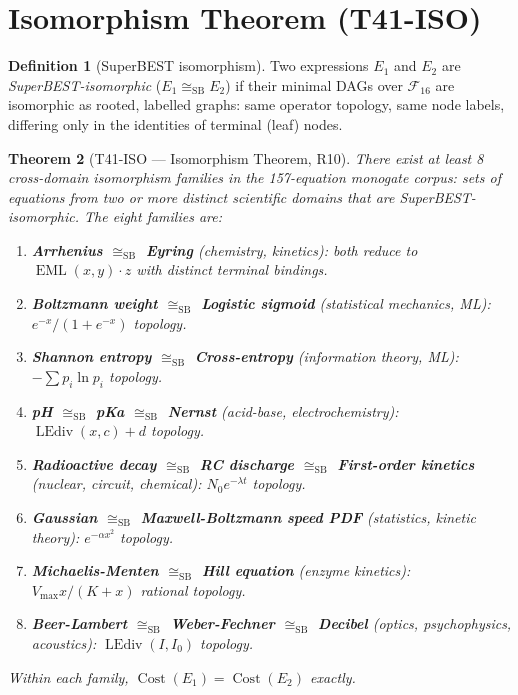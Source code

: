 \documentclass[12pt,a4paper]{article}
\newtheorem{theorem}{Theorem}[section]
\theoremstyle{definition}
\newtheorem{definition}[theorem]{Definition}
\newcommand{\EML}{\operatorname{EML}}
\newcommand{\LEdiv}{\operatorname{LEdiv}}
\newcommand{\Cost}{\operatorname{Cost}}
\newcommand{\siso}{\cong_{\mathrm{SB}}}
\begin{document}
\section{Isomorphism Theorem (T41-ISO)}
\label{sec:iso}

\begin{definition}[SuperBEST isomorphism]
\label{def:iso}
Two expressions $E_1$ and $E_2$ are \emph{SuperBEST-isomorphic}
($E_1 \siso E_2$) if their minimal DAGs over $\mathcal{F}_{16}$ are
isomorphic as rooted, labelled graphs: same operator topology, same node
labels, differing only in the identities of terminal (leaf) nodes.
\end{definition}

\begin{theorem}[T41-ISO --- Isomorphism Theorem, R10]
\label{thm:ISO}
There exist at least 8 cross-domain isomorphism families in the 157-equation
monogate corpus: sets of equations from two or more distinct scientific domains
that are SuperBEST-isomorphic.  The eight families are:
\begin{enumerate}
  \item \textbf{Arrhenius $\siso$ Eyring} (chemistry, kinetics):
        both reduce to $\EML(x, y) \cdot z$ with distinct terminal bindings.
  \item \textbf{Boltzmann weight $\siso$ Logistic sigmoid}
        (statistical mechanics, ML): $e^{-x}/(1+e^{-x})$ topology.
  \item \textbf{Shannon entropy $\siso$ Cross-entropy}
        (information theory, ML): $-\sum p_i \ln p_i$ topology.
  \item \textbf{pH $\siso$ pKa $\siso$ Nernst}
        (acid-base, electrochemistry): $\LEdiv(x, c) + d$ topology.
  \item \textbf{Radioactive decay $\siso$ RC discharge $\siso$ First-order kinetics}
        (nuclear, circuit, chemical): $N_0 e^{-\lambda t}$ topology.
  \item \textbf{Gaussian $\siso$ Maxwell-Boltzmann speed PDF}
        (statistics, kinetic theory): $e^{-\alpha x^2}$ topology.
  \item \textbf{Michaelis-Menten $\siso$ Hill equation}
        (enzyme kinetics): $V_{\max}x/(K+x)$ rational topology.
  \item \textbf{Beer-Lambert $\siso$ Weber-Fechner $\siso$ Decibel}
        (optics, psychophysics, acoustics): $\LEdiv(I, I_0)$ topology.
\end{enumerate}
Within each family, $\Cost(E_1) = \Cost(E_2)$ exactly.
\end{theorem}
\end{document}
